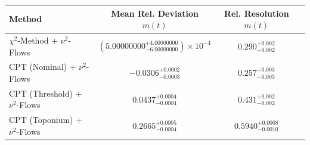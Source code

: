     \begin{tabular}{lccc}
        \toprule
        Method & Mean Rel. Deviation $m(t)$ & Rel. Resolution $m(t)$ \\
        \midrule
        $\chi^2$-Method + $\nu^2$-Flows & $(5.00000000^{+4.00000000}_{-6.00000000})\times 10^{-4}$ & $0.290^{+0.002}_{-0.002}$ \\
        CPT (Nominal) + $\nu^2$-Flows & $-0.0306^{+0.0002}_{-0.0003}$ & $0.257^{+0.003}_{-0.003}$ \\
        CPT (Threshold) + $\nu^2$-Flows & $0.0437^{+0.0004}_{-0.0004}$ & $0.431^{+0.002}_{-0.002}$ \\
        CPT (Toponium) + $\nu^2$-Flows & $0.2665^{+0.0005}_{-0.0004}$ & $0.5940^{+0.0008}_{-0.0010}$ \\
        \bottomrule
    \end{tabular}